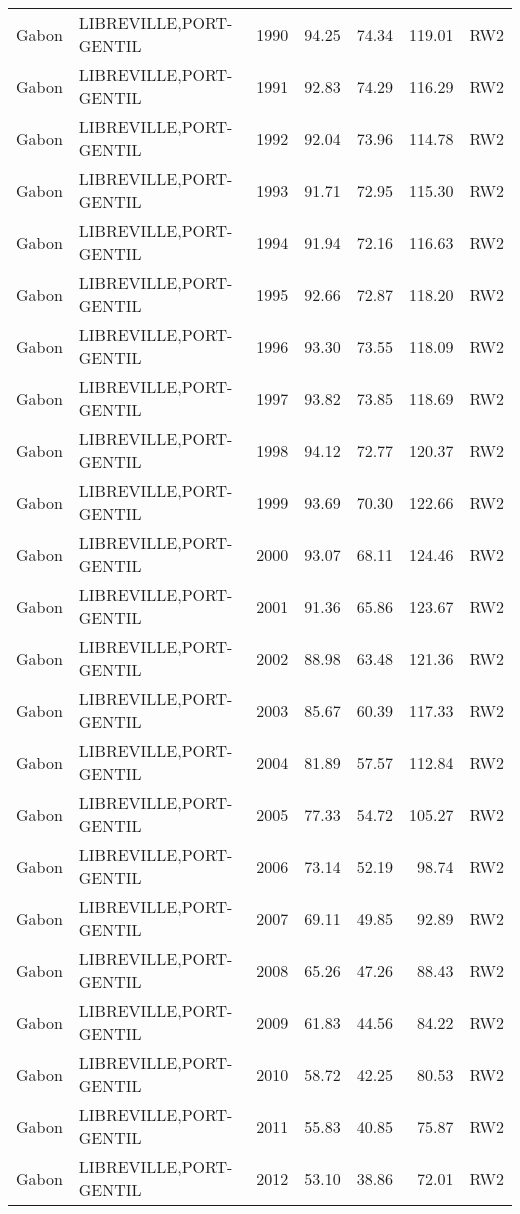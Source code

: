 \begin{longtable}{lllrrrl}
  Gabon & LIBREVILLE,PORT-GENTIL & 1990 & 94.25 & 74.34 & 119.01 & RW2 \\ 
  Gabon & LIBREVILLE,PORT-GENTIL & 1991 & 92.83 & 74.29 & 116.29 & RW2 \\ 
  Gabon & LIBREVILLE,PORT-GENTIL & 1992 & 92.04 & 73.96 & 114.78 & RW2 \\ 
  Gabon & LIBREVILLE,PORT-GENTIL & 1993 & 91.71 & 72.95 & 115.30 & RW2 \\ 
  Gabon & LIBREVILLE,PORT-GENTIL & 1994 & 91.94 & 72.16 & 116.63 & RW2 \\ 
  Gabon & LIBREVILLE,PORT-GENTIL & 1995 & 92.66 & 72.87 & 118.20 & RW2 \\ 
  Gabon & LIBREVILLE,PORT-GENTIL & 1996 & 93.30 & 73.55 & 118.09 & RW2 \\ 
  Gabon & LIBREVILLE,PORT-GENTIL & 1997 & 93.82 & 73.85 & 118.69 & RW2 \\ 
  Gabon & LIBREVILLE,PORT-GENTIL & 1998 & 94.12 & 72.77 & 120.37 & RW2 \\ 
  Gabon & LIBREVILLE,PORT-GENTIL & 1999 & 93.69 & 70.30 & 122.66 & RW2 \\ 
  Gabon & LIBREVILLE,PORT-GENTIL & 2000 & 93.07 & 68.11 & 124.46 & RW2 \\ 
  Gabon & LIBREVILLE,PORT-GENTIL & 2001 & 91.36 & 65.86 & 123.67 & RW2 \\ 
  Gabon & LIBREVILLE,PORT-GENTIL & 2002 & 88.98 & 63.48 & 121.36 & RW2 \\ 
  Gabon & LIBREVILLE,PORT-GENTIL & 2003 & 85.67 & 60.39 & 117.33 & RW2 \\ 
  Gabon & LIBREVILLE,PORT-GENTIL & 2004 & 81.89 & 57.57 & 112.84 & RW2 \\ 
  Gabon & LIBREVILLE,PORT-GENTIL & 2005 & 77.33 & 54.72 & 105.27 & RW2 \\ 
  Gabon & LIBREVILLE,PORT-GENTIL & 2006 & 73.14 & 52.19 & 98.74 & RW2 \\ 
  Gabon & LIBREVILLE,PORT-GENTIL & 2007 & 69.11 & 49.85 & 92.89 & RW2 \\ 
  Gabon & LIBREVILLE,PORT-GENTIL & 2008 & 65.26 & 47.26 & 88.43 & RW2 \\ 
  Gabon & LIBREVILLE,PORT-GENTIL & 2009 & 61.83 & 44.56 & 84.22 & RW2 \\ 
  Gabon & LIBREVILLE,PORT-GENTIL & 2010 & 58.72 & 42.25 & 80.53 & RW2 \\ 
  Gabon & LIBREVILLE,PORT-GENTIL & 2011 & 55.83 & 40.85 & 75.87 & RW2 \\ 
  Gabon & LIBREVILLE,PORT-GENTIL & 2012 & 53.10 & 38.86 & 72.01 & RW2 \\ 

\end{longtable}

